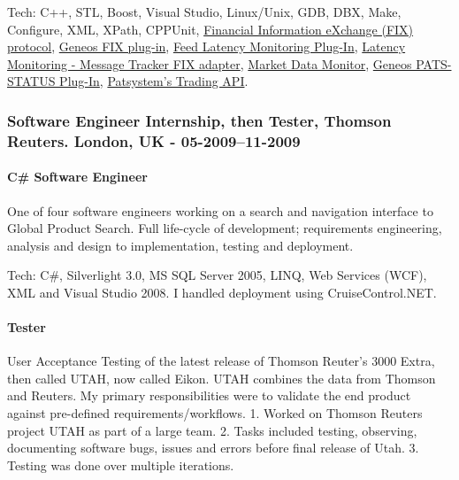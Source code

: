 \documentclass[
  a4paper,
]{article}
\begin{document}
Tech: C++, STL, Boost, Visual Studio, Linux/Unix, GDB, DBX, Make,
Configure, XML, XPath, CPPUnit,
\href{https://en.wikipedia.org/wiki/Financial_Information_eXchange}{Financial
Information eXchange (FIX) protocol},
\href{https://docs.itrsgroup.com/docs/geneos/5.1.0/Netprobe/trading_fix/fix.html}{Geneos
FIX plug-in},
\href{https://docs.itrsgroup.com/docs/geneos/5.2.0/Netprobe/market_data_monitoring/feedadapter_ug.html}{Feed
Latency Monitoring Plug-In},
\href{https://docs.itrsgroup.com/docs/geneos/5.2.0/Netprobe/latency_monitoring/message_tracker/fix_adapter.html}{Latency
Monitoring - Message Tracker FIX adapter},
\href{https://docs.itrsgroup.com/docs/geneos/5.2.0/Netprobe/market_data_monitoring/mdm_ug.html}{Market
Data Monitor},
\href{https://docs.itrsgroup.com/docs/geneos/5.1.0/Netprobe/trading_pats/pats-status.html}{Geneos
PATS-STATUS Plug-In}, \href{www.patsystems.com}{Patsystem's Trading
API}.

\hypertarget{software-engineer-internship-then-tester-thomson-reuters.-london-uk---05-200911-2009}{%
\subsubsection{Software Engineer Internship, then Tester, Thomson
Reuters. London, UK -
05-2009--11-2009}\label{software-engineer-internship-then-tester-thomson-reuters.-london-uk---05-200911-2009}}

\hypertarget{c-software-engineer}{%
\paragraph{C\# Software Engineer}\label{c-software-engineer}}

One of four software engineers working on a search and navigation
interface to Global Product Search. Full life-cycle of development;
requirements engineering, analysis and design to implementation, testing
and deployment.

Tech: C\#, Silverlight 3.0, MS SQL Server 2005, LINQ, Web Services
(WCF), XML and Visual Studio 2008. I handled deployment using
CruiseControl.NET.

\hypertarget{tester}{%
\paragraph{Tester}\label{tester}}

User Acceptance Testing of the latest release of Thomson Reuter's 3000
Extra, then called UTAH, now called Eikon. UTAH combines the data from
Thomson and Reuters. My primary responsibilities were to validate the
end product against pre-defined requirements/workflows. 1. Worked on
Thomson Reuters project UTAH as part of a large team. 2. Tasks included
testing, observing, documenting software bugs, issues and errors before
final release of Utah. 3. Testing was done over multiple iterations.
\end{document}
